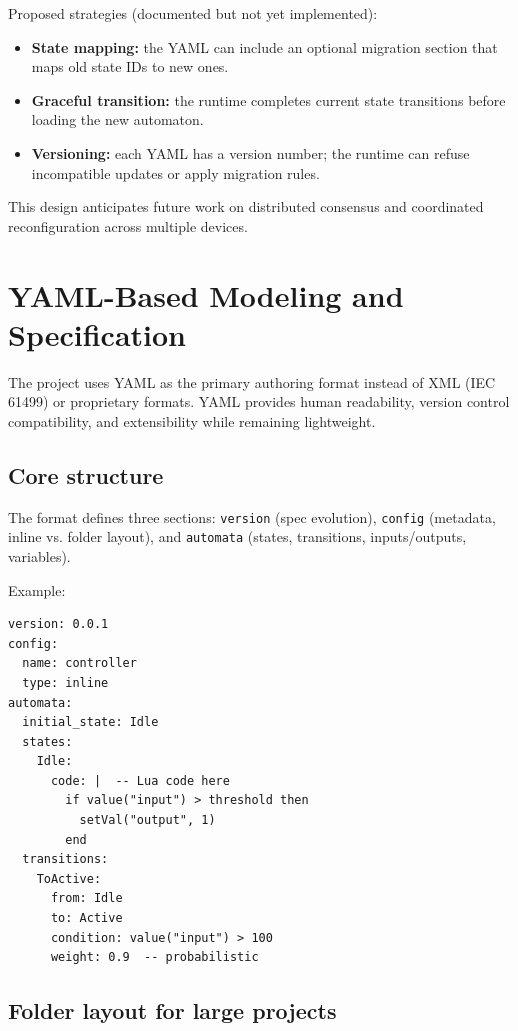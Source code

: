 Proposed strategies (documented but not yet implemented):
\begin{itemize}
  \item \textbf{State mapping:} the YAML can include an optional migration section that maps old state IDs to new ones.
  \item \textbf{Graceful transition:} the runtime completes current state transitions before loading the new automaton.
  \item \textbf{Versioning:} each YAML has a version number; the runtime can refuse incompatible updates or apply migration rules.
\end{itemize}

This design anticipates future work on distributed consensus and coordinated reconfiguration across multiple devices.

\section{YAML-Based Modeling and Specification}
\label{sec:yaml}

The project uses YAML as the primary authoring format instead of XML (IEC 61499) or proprietary formats.
YAML provides human readability, version control compatibility, and extensibility while remaining lightweight.

\subsection{Core structure}

The format defines three sections: \texttt{version} (spec evolution), \texttt{config} (metadata, inline vs. folder layout), and \texttt{automata} (states, transitions, inputs/outputs, variables).

Example:
\begin{verbatim}
version: 0.0.1
config:
  name: controller
  type: inline
automata:
  initial_state: Idle
  states:
    Idle:
      code: |  -- Lua code here
        if value("input") > threshold then
          setVal("output", 1)
        end
  transitions:
    ToActive:
      from: Idle
      to: Active
      condition: value("input") > 100
      weight: 0.9  -- probabilistic
\end{verbatim}

\subsection{Folder layout for large projects}

